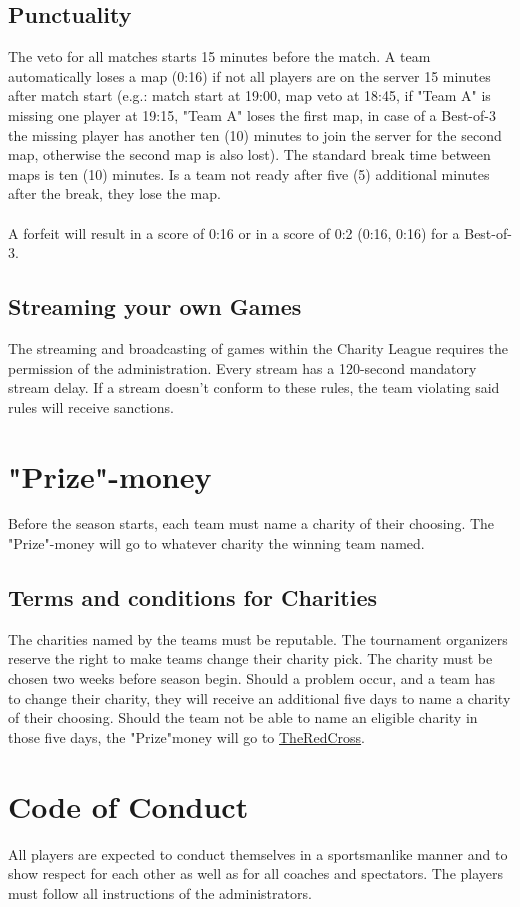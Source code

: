 \documentclass{article}
\begin{document}
\subsection{Punctuality}
The veto for all matches starts 15 minutes before the match. A team automatically loses a map (0:16) if not all players are on the server 
15 minutes after match start (e.g.: match start at 19:00, map veto at 18:45, if "Team A" is missing one player at 19:15, "Team A" 
loses the first map, in case of a Best-of-3 the missing player has another ten (10) minutes to join the server for the second map, 
otherwise the second map is also lost). The standard break time between maps is ten (10) minutes. Is a team not ready after five (5) 
additional minutes after the break, they lose the map. \\
\\
A forfeit will result in a score of 0:16 or in a score of 0:2 (0:16, 0:16) for a Best-of-3.



\subsection{Streaming your own Games}
The streaming and broadcasting of games within the Charity League requires the permission of the
administration. Every stream has a 120-second mandatory stream delay. If a stream doesn't conform to 
these rules, the team violating said rules will receive sanctions.

\section{"Prize"-money}
Before the season starts, each team must name a charity of their choosing. The "Prize"-money will go to whatever charity the winning team
named. \\

\subsection{Terms and conditions for Charities}
The charities named by the teams must be reputable. The tournament organizers reserve the right to make teams change their charity pick.
The charity must be chosen two weeks before season begin. Should a problem occur, and a team has to change their charity, they will 
receive an additional five days to name a charity of their choosing. Should the team not be able to name an eligible charity in those 
five days, the "Prize"money will go to \href{https://www.redcross.org/}{TheRedCross}. 


\section{Code of Conduct}
All players are expected to conduct themselves in a sportsmanlike manner and to show respect for each other
as well as for all coaches and spectators. The players must follow all instructions of the administrators. 
\end{document}
